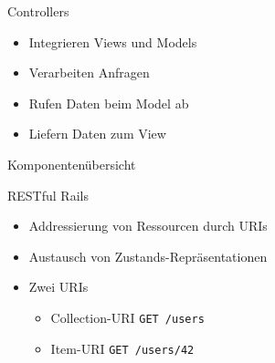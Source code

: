 \begin{Frame}{Controllers}
  \begin{itemize}
    \item Integrieren Views und Models
    \item Verarbeiten Anfragen
    \item Rufen Daten beim Model ab
    \item Liefern Daten zum View
  \end{itemize}
\end{Frame}

\begin{Frame}{Komponentenübersicht}
  \begin{center}
    
  \end{center}
\end{Frame}

\begin{Frame}{RESTful Rails}
  \begin{itemize}
    \item Addressierung von Ressourcen durch URIs
    \item Austausch von Zustands-Repräsentationen
    \item Zwei URIs
    \begin{itemize}
      \item Collection-URI \newline \lstinline|GET /users|
      \item Item-URI \newline \lstinline|GET /users/42|
    \end{itemize}
  \end{itemize}
\end{Frame}

